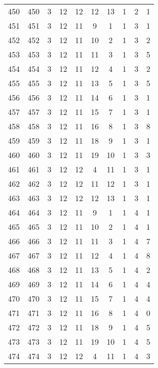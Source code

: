 \begin{longtable}{cccccccccc}
  450 & 450 &   3 &  12 &  12 &  12 &  13 &   1 &   2 &   1 \\ 
  451 & 451 &   3 &  12 &  11 &   9 &   1 &   1 &   3 &   1 \\ 
  452 & 452 &   3 &  12 &  11 &  10 &   2 &   1 &   3 &   2 \\ 
  453 & 453 &   3 &  12 &  11 &  11 &   3 &   1 &   3 &   5 \\ 
  454 & 454 &   3 &  12 &  11 &  12 &   4 &   1 &   3 &   2 \\ 
  455 & 455 &   3 &  12 &  11 &  13 &   5 &   1 &   3 &   5 \\ 
  456 & 456 &   3 &  12 &  11 &  14 &   6 &   1 &   3 &   1 \\ 
  457 & 457 &   3 &  12 &  11 &  15 &   7 &   1 &   3 &   1 \\ 
  458 & 458 &   3 &  12 &  11 &  16 &   8 &   1 &   3 &   8 \\ 
  459 & 459 &   3 &  12 &  11 &  18 &   9 &   1 &   3 &   1 \\ 
  460 & 460 &   3 &  12 &  11 &  19 &  10 &   1 &   3 &   3 \\ 
  461 & 461 &   3 &  12 &  12 &   4 &  11 &   1 &   3 &   1 \\ 
  462 & 462 &   3 &  12 &  12 &  11 &  12 &   1 &   3 &   1 \\ 
  463 & 463 &   3 &  12 &  12 &  12 &  13 &   1 &   3 &   1 \\ 
  464 & 464 &   3 &  12 &  11 &   9 &   1 &   1 &   4 &   1 \\ 
  465 & 465 &   3 &  12 &  11 &  10 &   2 &   1 &   4 &   1 \\ 
  466 & 466 &   3 &  12 &  11 &  11 &   3 &   1 &   4 &   7 \\ 
  467 & 467 &   3 &  12 &  11 &  12 &   4 &   1 &   4 &   8 \\ 
  468 & 468 &   3 &  12 &  11 &  13 &   5 &   1 &   4 &   2 \\ 
  469 & 469 &   3 &  12 &  11 &  14 &   6 &   1 &   4 &   4 \\ 
  470 & 470 &   3 &  12 &  11 &  15 &   7 &   1 &   4 &   4 \\ 
  471 & 471 &   3 &  12 &  11 &  16 &   8 &   1 &   4 &   0 \\ 
  472 & 472 &   3 &  12 &  11 &  18 &   9 &   1 &   4 &   5 \\ 
  473 & 473 &   3 &  12 &  11 &  19 &  10 &   1 &   4 &   5 \\ 
  474 & 474 &   3 &  12 &  12 &   4 &  11 &   1 &   4 &   3 \\ 

\end{longtable}

